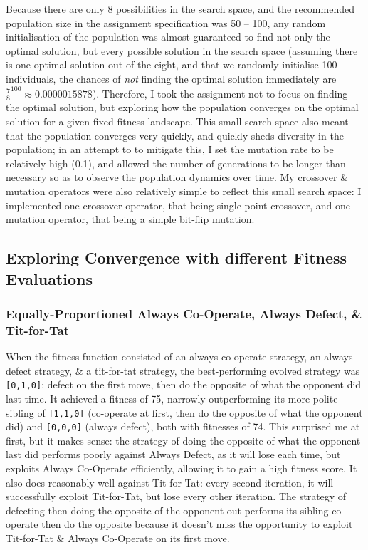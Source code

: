\documentclass[a4paper]{article}
\begin{document}
Because there are only 8 possibilities in the search space, and the recommended population size in the assignment specification was 50 -- 100, any random initialisation of the population was almost guaranteed to find not only the optimal solution, but every possible solution in the search space (assuming there is one optimal solution out of the eight, and that we randomly initialise 100 individuals, the chances of \textit{not} finding the optimal solution immediately are $\frac{7}{8}^{100} \approx 0.0000015878$).
Therefore, I took the assignment not to focus on finding the optimal solution, but exploring how the population converges on the optimal solution for a given fixed fitness landscape.
This small search space also meant that the population converges very quickly, and quickly sheds diversity in the population;
in an attempt to to mitigate this, I set the mutation rate to be relatively high (0.1), and allowed the number of generations to be longer than necessary so as to observe the population dynamics over time.
My crossover \& mutation operators were also relatively simple to reflect this small search space:
I implemented one crossover operator, that being single-point crossover, and one mutation operator, that being a simple bit-flip mutation.

\subsection{Exploring Convergence with different Fitness Evaluations}
\subsubsection{Equally-Proportioned Always Co-Operate, Always Defect, \& Tit-for-Tat}
When the fitness function consisted of an always co-operate strategy, an always defect strategy, \& a tit-for-tat strategy, the best-performing evolved strategy was \verb|[0,1,0]|: defect on the first move, then do the opposite of what the opponent did last time.
It achieved a fitness of 75, narrowly outperforming its more-polite sibling of \verb|[1,1,0]| (co-operate at first, then do the opposite of what the opponent did) and \verb|[0,0,0]| (always defect), both with fitnesses of 74.
This surprised me at first, but it makes sense:
the strategy of doing the opposite of what the opponent last did performs poorly against Always Defect, as it will lose each time, but exploits Always Co-Operate efficiently, allowing it to gain a high fitness score.
It also does reasonably well against Tit-for-Tat: every second iteration, it will successfully exploit Tit-for-Tat, but lose every other iteration.
The strategy of defecting then doing the opposite of the opponent out-performs its sibling co-operate then do the opposite because it doesn't miss the opportunity to exploit Tit-for-Tat \& Always Co-Operate on its first move.
\end{document}
